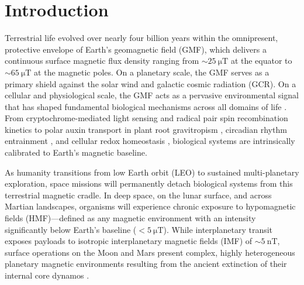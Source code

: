 \section{Introduction}
\label{sec:intro}

Terrestrial life evolved over nearly four billion years within the omnipresent, protective envelope of Earth's geomagnetic field (GMF), which delivers a continuous surface magnetic flux density ranging from $\sim\SI{25}{\micro\tesla}$ at the equator to $\sim\SI{65}{\micro\tesla}$ at the magnetic poles. On a planetary scale, the GMF serves as a primary shield against the solar wind and galactic cosmic radiation (GCR). On a cellular and physiological scale, the GMF acts as a pervasive environmental signal that has shaped fundamental biological mechanisms across all domains of life \citep{Maffei2014, Binhi2017}. From cryptochrome-mediated light sensing and radical pair spin recombination kinetics \citep{Hore2016, Ritz2000} to polar auxin transport in plant root gravitropism \citep{Narayana2018}, circadian rhythm entrainment \citep{Yoshii2009}, and cellular redox homeostasis \citep{Belyavskaya2004}, biological systems are intrinsically calibrated to Earth's magnetic baseline.

As humanity transitions from low Earth orbit (LEO) to sustained multi-planetary exploration, space missions will permanently detach biological systems from this terrestrial magnetic cradle. In deep space, on the lunar surface, and across Martian landscapes, organisms will experience chronic exposure to hypomagnetic fields (HMF)—defined as any magnetic environment with an intensity significantly below Earth's baseline ($<\SI{5}{\micro\tesla}$). While interplanetary transit exposes payloads to isotropic interplanetary magnetic fields (IMF) of $\sim\SI{5}{\nano\tesla}$, surface operations on the Moon and Mars present complex, highly heterogeneous planetary magnetic environments resulting from the ancient extinction of their internal core dynamos \citep{Acuna1999, Wieczorek2006}.

